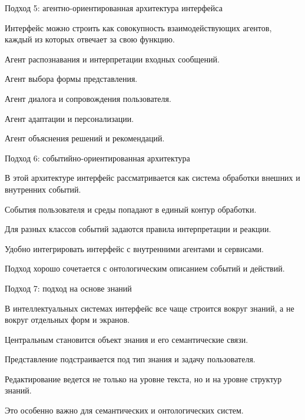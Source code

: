 \begin{frame}{Подход 5: агентно-ориентированная архитектура интерфейса}
	\topline
	\justifying

	Интерфейс можно строить как совокупность взаимодействующих агентов, каждый из которых отвечает за свою функцию.
	
	\begin{textitemize}
		\item Агент распознавания и интерпретации входных сообщений.
		\item Агент выбора формы представления.
		\item Агент диалога и сопровождения пользователя.
		\item Агент адаптации и персонализации.
		\item Агент объяснения решений и рекомендаций.
	\end{textitemize}
\end{frame}

\begin{frame}{Подход 6: событийно-ориентированная архитектура}
	\topline
	\justifying

	В этой архитектуре интерфейс рассматривается как система обработки внешних и внутренних событий.
	
	\begin{textitemize}
		\item События пользователя и среды попадают в единый контур обработки.
		\item Для разных классов событий задаются правила интерпретации и реакции.
		\item Удобно интегрировать интерфейс с внутренними агентами и сервисами.
		\item Подход хорошо сочетается с онтологическим описанием событий и действий.
	\end{textitemize}
\end{frame}

\begin{frame}{Подход 7: подход на основе знаний}
	\topline
	\justifying

	В интеллектуальных системах интерфейс все чаще строится вокруг знаний, а не вокруг отдельных форм и экранов.
	
	\begin{textitemize}
		\item Центральным становится объект знания и его семантические связи.
		\item Представление подстраивается под тип знания и задачу пользователя.
		\item Редактирование ведется не только на уровне текста, но и на уровне структур знаний.
		\item Это особенно важно для семантических и онтологических систем.
	\end{textitemize}
\end{frame}


